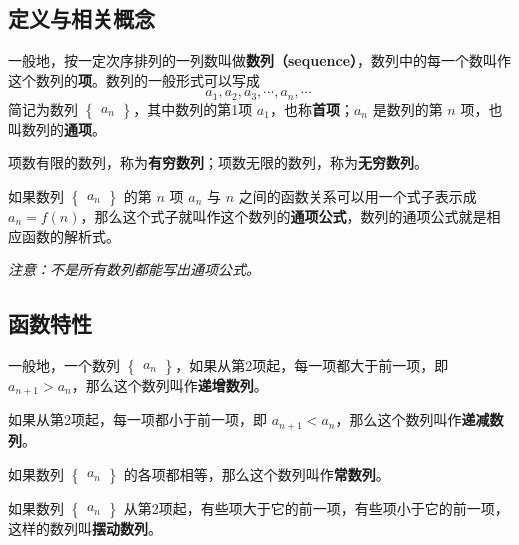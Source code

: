 

\subsection{定义与相关概念}
一般地，按一定次序排列的一列数叫做\textbf{数列（sequence）}，数列中的每一个数叫作这个数列的\textbf{项}。数列的一般形式可以写成
\begin{equation}
a_1,a_2,a_3,\cdots,a_n,\cdots~
\end{equation}
简记为数列 $\begin{Bmatrix} a_n \end{Bmatrix}$，其中数列的第1项 $a_1$，也称\textbf{首项}；$a_n$ 是数列的第 $n$ 项，也叫数列的\textbf{通项}。

项数有限的数列，称为\textbf{有穷数列}；项数无限的数列，称为\textbf{无穷数列}。

如果数列 $\begin{Bmatrix} a_n \end{Bmatrix}$ 的第 $n$ 项 $a_n$ 与 $n$ 之间的函数关系可以用一个式子表示成 $a_n = f(n)$，那么这个式子就叫作这个数列的\textbf{通项公式}，数列的通项公式就是相应函数的解析式。

\textsl{注意：不是所有数列都能写出通项公式。}

\subsection{函数特性}
一般地，一个数列 $\begin{Bmatrix} a_n \end{Bmatrix}$，如果从第2项起，每一项都大于前一项，即 $a_{n+1}>a_n$，那么这个数列叫作\textbf{递增数列}。

如果从第2项起，每一项都小于前一项，即 $a_{n+1}<a_n$，那么这个数列叫作\textbf{递减数列}。

如果数列 $\begin{Bmatrix} a_n \end{Bmatrix}$ 的各项都相等，那么这个数列叫作\textbf{常数列}。

如果数列 $\begin{Bmatrix} a_n \end{Bmatrix}$ 从第2项起，有些项大于它的前一项，有些项小于它的前一项，这样的数列叫\textbf{摆动数列}。